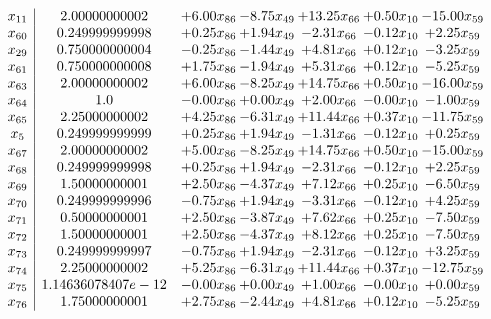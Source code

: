 \documentclass[8pt]{article}
\begin{document}
\[\begin{array}{c| c c@{\hskip 2pt} c@{\hskip 2pt} c@{\hskip 2pt} c@{\hskip 2pt} c@{\hskip 2pt} }
 x_{11}   &  2.00000000002 & +  6.00 x_{86} & -8.75 x_{49} & + 13.25 x_{66} & +  0.50 x_{10} & -15.00 x_{59}\\
 x_{60}   &  0.249999999998 & +  0.25 x_{86} & +  1.94 x_{49} & -2.31 x_{66} & -0.12 x_{10} & +  2.25 x_{59}\\
 x_{29}   &  0.750000000004 & -0.25 x_{86} & -1.44 x_{49} & +  4.81 x_{66} & +  0.12 x_{10} & -3.25 x_{59}\\
 x_{61}   &  0.750000000008 & +  1.75 x_{86} & -1.94 x_{49} & +  5.31 x_{66} & +  0.12 x_{10} & -5.25 x_{59}\\
 x_{63}   &  2.00000000002 & +  6.00 x_{86} & -8.25 x_{49} & + 14.75 x_{66} & +  0.50 x_{10} & -16.00 x_{59}\\
 x_{64}   &  1.0 & -0.00 x_{86} & +  0.00 x_{49} & +  2.00 x_{66} & -0.00 x_{10} & -1.00 x_{59}\\
 x_{65}   &  2.25000000002 & +  4.25 x_{86} & -6.31 x_{49} & + 11.44 x_{66} & +  0.37 x_{10} & -11.75 x_{59}\\
 x_{5}   &  0.249999999999 & +  0.25 x_{86} & +  1.94 x_{49} & -1.31 x_{66} & -0.12 x_{10} & +  0.25 x_{59}\\
 x_{67}   &  2.00000000002 & +  5.00 x_{86} & -8.25 x_{49} & + 14.75 x_{66} & +  0.50 x_{10} & -15.00 x_{59}\\
 x_{68}   &  0.249999999998 & +  0.25 x_{86} & +  1.94 x_{49} & -2.31 x_{66} & -0.12 x_{10} & +  2.25 x_{59}\\
 x_{69}   &  1.50000000001 & +  2.50 x_{86} & -4.37 x_{49} & +  7.12 x_{66} & +  0.25 x_{10} & -6.50 x_{59}\\
 x_{70}   &  0.249999999996 & -0.75 x_{86} & +  1.94 x_{49} & -3.31 x_{66} & -0.12 x_{10} & +  4.25 x_{59}\\
 x_{71}   &  0.50000000001 & +  2.50 x_{86} & -3.87 x_{49} & +  7.62 x_{66} & +  0.25 x_{10} & -7.50 x_{59}\\
 x_{72}   &  1.50000000001 & +  2.50 x_{86} & -4.37 x_{49} & +  8.12 x_{66} & +  0.25 x_{10} & -7.50 x_{59}\\
 x_{73}   &  0.249999999997 & -0.75 x_{86} & +  1.94 x_{49} & -2.31 x_{66} & -0.12 x_{10} & +  3.25 x_{59}\\
 x_{74}   &  2.25000000002 & +  5.25 x_{86} & -6.31 x_{49} & + 11.44 x_{66} & +  0.37 x_{10} & -12.75 x_{59}\\
 x_{75}   &  1.14636078407e-12 & -0.00 x_{86} & +  0.00 x_{49} & +  1.00 x_{66} & -0.00 x_{10} & +  0.00 x_{59}\\
 x_{76}   &  1.75000000001 & +  2.75 x_{86} & -2.44 x_{49} & +  4.81 x_{66} & +  0.12 x_{10} & -5.25 x_{59}\\

\end{array}\]
\end{document}

